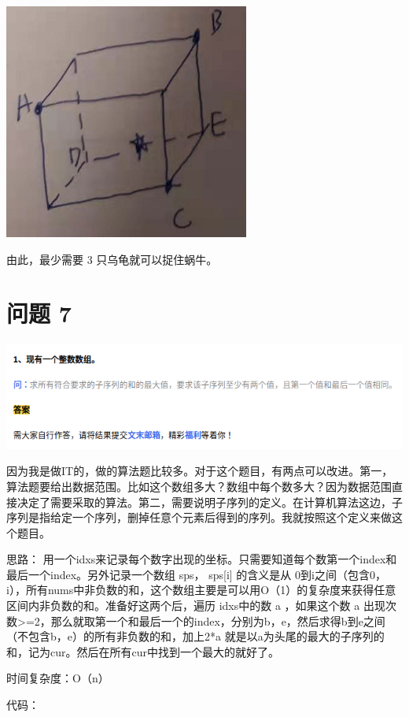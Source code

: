 \documentclass{article}
\begin{document}
\includegraphics[scale=0.5]{cube04.png}

由此，最少需要 3 只乌龟就可以捉住蜗牛。



\newpage
\section{问题 7}
\includegraphics[scale=0.7]{algo.png}

因为我是做IT的，做的算法题比较多。对于这个题目，有两点可以改进。第一，算法题要给出数据范围。比如这个数组多大？数组中每个数多大？因为数据范围直接决定了需要采取的算法。第二，需要说明子序列的定义。在计算机算法这边，子序列是指给定一个序列，删掉任意个元素后得到的序列。我就按照这个定义来做这个题目。

思路： 用一个idxs来记录每个数字出现的坐标。只需要知道每个数第一个index和最后一个index。另外记录一个数组 sps， sps[i] 的含义是从 0到i之间（包含0，i），所有nums中非负数的和，这个数组主要是可以用O（1）的复杂度来获得任意区间内非负数的和。准备好这两个后，遍历 idxs中的数 a ，如果这个数 a 出现次数>=2，那么就取第一个和最后一个的index，分别为b，e，然后求得b到e之间（不包含b，e）的所有非负数的和，加上2*a 就是以a为头尾的最大的子序列的和，记为cur。然后在所有cur中找到一个最大的就好了。

时间复杂度：O（n）

代码：
\end{document}
